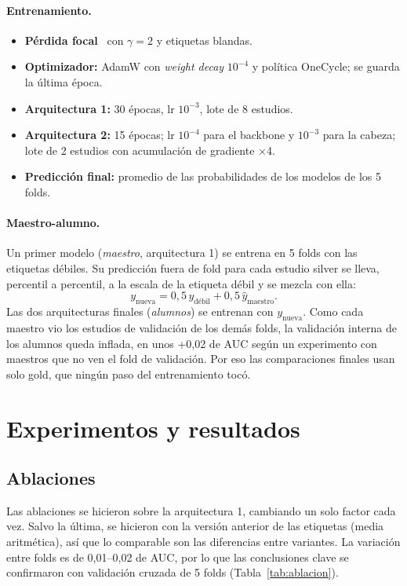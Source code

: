 \documentclass{article}
\begin{document}
\paragraph{Entrenamiento.}
\begin{itemize}
  \item \textbf{Pérdida focal}~\cite{lin2017focal} con $\gamma = 2$ y etiquetas blandas.
  \item \textbf{Optimizador:} AdamW con \emph{weight decay} $10^{-4}$ y política OneCycle; se guarda la última época.
  \item \textbf{Arquitectura 1:} 30 épocas, lr $10^{-3}$, lote de 8 estudios.
  \item \textbf{Arquitectura 2:} 15 épocas; lr $10^{-4}$ para el backbone y $10^{-3}$ para la cabeza; lote de 2 estudios con acumulación de gradiente ×4.
  \item \textbf{Predicción final:} promedio de las probabilidades de los modelos de los 5 folds.
\end{itemize}

\paragraph{Maestro-alumno.} Un primer modelo (\emph{maestro}, arquitectura 1) se entrena en 5 folds con las etiquetas débiles. Su predicción fuera de fold para cada estudio silver se lleva, percentil a percentil, a la escala de la etiqueta débil y se mezcla con ella:
$$y_{\text{nueva}} = 0{,}5\, y_{\text{débil}} + 0{,}5\, \hat{y}_{\text{maestro}}.$$
Las dos arquitecturas finales (\emph{alumnos}) se entrenan con $y_{\text{nueva}}$. Como cada maestro vio los estudios de validación de los demás folds, la validación interna de los alumnos queda inflada, en unos +0,02 de AUC según un experimento con maestros que no ven el fold de validación. Por eso las comparaciones finales usan solo gold, que ningún paso del entrenamiento tocó.

\section{Experimentos y resultados}

\subsection{Ablaciones}
\label{sec:ablaciones}

Las ablaciones se hicieron sobre la arquitectura 1, cambiando un solo factor cada vez. Salvo la última, se hicieron con la versión anterior de las etiquetas (media aritmética), así que lo comparable son las diferencias entre variantes. La variación entre folds es de 0,01--0,02 de AUC, por lo que las conclusiones clave se confirmaron con validación cruzada de 5 folds (Tabla~\ref{tab:ablacion}).
\end{document}
